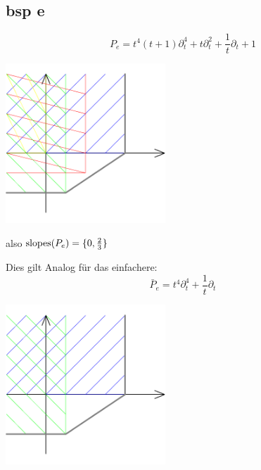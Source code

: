 \subsection{bsp e}

\[
  P_e=t^4(t+1)\partial_t^4 + t\partial_t^2+\frac{1}{t}\partial_t+1
\]

\begin{center}
  \includegraphics[width=6cm]{beispiele/img/e.png}
\end{center}

also $\operatorname{slopes}(P_e)=\{0,\frac{2}{3}\}$

Dies gilt Analog für das einfachere:
\[
  \bar P_e=t^4\partial_t^4 +\frac{1}{t}\partial_t
\]

\begin{center}
  \includegraphics[width=6cm]{beispiele/img/bar_e.png}
\end{center}

